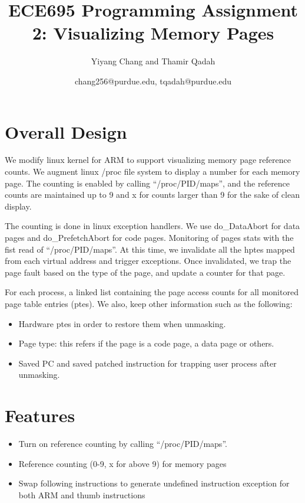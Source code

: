 \documentclass[11pt]{article}
\title{ECE695 Programming Assignment 2: Visualizing Memory Pages}
\author{Yiyang Chang and Thamir Qadah}
\date{chang256@purdue.edu, tqadah@purdue.edu}
\theoremstyle{plain} \numberwithin{equation}{section}
\theoremstyle{definition}
\newcounter{list}
\begin{document}

\maketitle

\section{Overall Design}
\vspace{-0.1in}
We modify linux kernel for ARM to support visualizing memory page reference
counts. We augment linux /proc file system to display a number for each memory
page. The counting is enabled by calling ``/proc/PID/maps'', and the reference
counts are maintained up to 9 and x for counts larger than 9 for the sake of
clean display. 

The counting is done in linux exception handlers. We use do\_DataAbort for data pages and 
do\_PrefetchAbort for code pages. Monitoring of pages stats with the fist read of 
``/proc/PID/maps''. At this time, we invalidate all the hptes mapped from each virtual 
address and trigger exceptions. Once invalidated, we trap the page fault based on the 
type of the page, and update a counter for that page. 

For each process, a linked list containing the page access counts for all monitored page 
table entries (ptes). We also, keep other information such as the following:
\begin{itemize}
	\item Hardware ptes in order to restore them when unmasking.
	\item Page type: this refers if the page is a code page, a data page or others. 
	\item Saved PC and saved patched instruction for trapping user process after 
unmasking. 
	\end{itemize}


\section{Features}
\vspace{-0.1in}
\begin{itemize}
	\item Turn on reference counting by calling ``/proc/PID/maps''. 
	\item Reference counting (0-9, x for above 9) for memory pages
	\item Swap following instructions to generate undefined instruction
		exception for both ARM and thumb instructions 
	\end{itemize}
\end{document}
